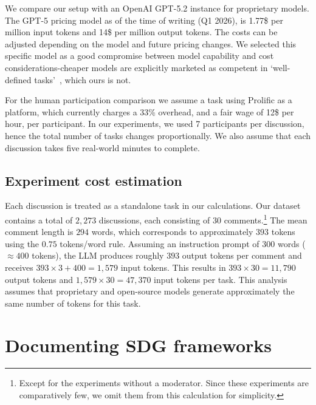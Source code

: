 We compare our setup with an OpenAI GPT-5.2 instance for proprietary models. The GPT-5 pricing model as of the time of writing (Q1 2026), is 1.77\$ per million input tokens and 14\$ per million output tokens. The costs can be adjusted depending on the model and future pricing changes. We selected this specific model as a good compromise between model capability and cost considerations-cheaper models are explicitly marketed as competent in `well-defined tasks'~\cite{openai-pricing}, which ours is not.

For the human participation comparison we assume a task using Prolific as a platform, which currently charges a 33\% overhead, and a fair wage of 12\$ per hour, per participant. In our experiments, we used 7 participants per discussion, hence the total number of tasks changes proportionally. We also assume that each discussion takes five real-world minutes to complete.


\subsection{Experiment cost estimation}

Each discussion is treated as a standalone task in our calculations. Our dataset contains a total of $2{,}273$ discussions, each consisting of $30$ comments.\footnote{Except for the experiments without a moderator. Since these experiments are comparatively few, we omit them from this calculation for simplicity.} The mean comment length is $294$ words, which corresponds to approximately $393$ tokens using the $0.75$ tokens/word rule. Assuming an instruction prompt of $300$ words ($\approx 400$ tokens), the LLM produces roughly $393$ output tokens per comment and receives $393 \times 3 + 400 = 1{,}579$ input tokens. This results in $393 \times 30 = 11{,}790$ output tokens and $1{,}579 \times 30 = 47{,}370$ input tokens per task. This analysis assumes that proprietary and open-source models generate approximately the same number of tokens for this task.

\section{Documenting SDG frameworks}
\label{sec:appendix:documentation}


